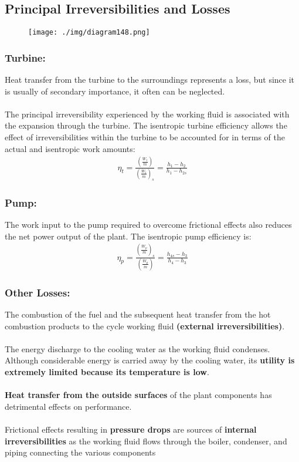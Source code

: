 \subsection{Principal Irreversibilities and Losses}
\begin{figure}[H]
  \centering
  \texttt{[image: ./img/diagram148.png]}
  \caption{}
\end{figure}
\subsubsection{Turbine:}
Heat transfer from the turbine to the surroundings represents a loss, but since it is usually of secondary importance, it often can be neglected. \\\\
The principal irreversibility experienced by the working fluid is associated with the expansion through the turbine. The isentropic turbine efficiency allows the effect of irreversibilities within the turbine to be accounted for in terms of the actual and isentropic work amounts:
\begin{gather}
  \eta_t = \frac{\left(\frac{\dot{W}_t}{\dot{m}}\right)}{\left(\frac{\dot{W}_t}{\dot{m}}\right)_s} = \frac{h_1-h_2}{h_1-h_{2s}}
\end{gather}
\subsubsection{Pump:}
The work input to the pump required to overcome frictional effects also reduces the net power output of the plant. The isentropic pump efficiency is:
\begin{gather}
  \eta_p = \frac{\left(\frac{\dot{W}_p}{\dot{m}}\right)_s}{\left(\frac{\dot{W}_p}{\dot{m}}\right)} = \frac{h_{4s}-h_3}{h_4-h_3}
\end{gather}
\subsubsection{Other Losses:}
The combustion of the fuel and the subsequent heat transfer from the hot combustion products to the cycle working fluid \textbf{(external irreversibilities)}. \\\\
The energy discharge to the cooling water as the working fluid condenses. Although considerable energy is carried away by the cooling water, its \textbf{utility is extremely limited because its temperature is low}. \\\\
\textbf{Heat transfer from the outside surfaces} of the plant components has detrimental effects on performance. \\\\
Frictional effects resulting in \textbf{pressure drops} are sources of \textbf{internal irreversibilities} as the working fluid flows through the boiler, condenser, and piping connecting the various components
